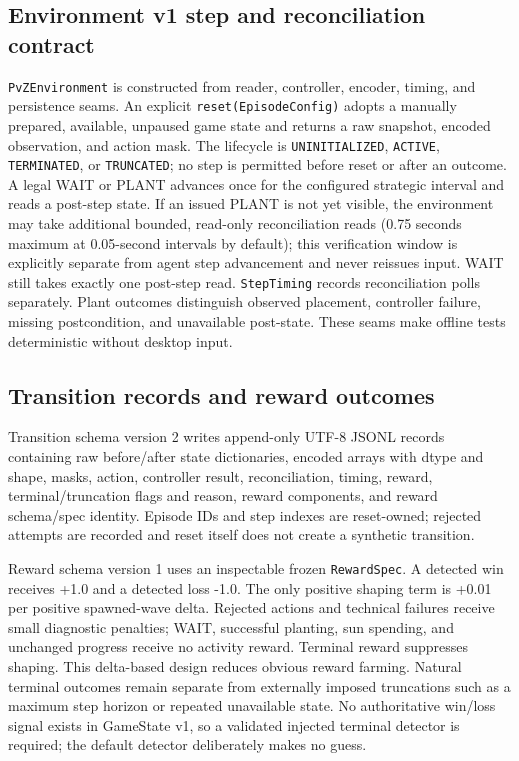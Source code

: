 \documentclass[11pt,a4paper]{article}
\begin{document}
\subsection{Environment v1 step and reconciliation contract}
\texttt{PvZEnvironment} is constructed from reader, controller, encoder, timing, and persistence seams. An explicit \texttt{reset(EpisodeConfig)} adopts a manually prepared, available, unpaused game state and returns a raw snapshot, encoded observation, and action mask. The lifecycle is \texttt{UNINITIALIZED}, \texttt{ACTIVE}, \texttt{TERMINATED}, or \texttt{TRUNCATED}; no step is permitted before reset or after an outcome. A legal WAIT or PLANT advances once for the configured strategic interval and reads a post-step state. If an issued PLANT is not yet visible, the environment may take additional bounded, read-only reconciliation reads (0.75 seconds maximum at 0.05-second intervals by default); this verification window is explicitly separate from agent step advancement and never reissues input. WAIT still takes exactly one post-step read. \texttt{StepTiming} records reconciliation polls separately. Plant outcomes distinguish observed placement, controller failure, missing postcondition, and unavailable post-state. These seams make offline tests deterministic without desktop input.

\subsection{Transition records and reward outcomes}
Transition schema version 2 writes append-only UTF-8 JSONL records containing raw before/after state dictionaries, encoded arrays with dtype and shape, masks, action, controller result, reconciliation, timing, reward, terminal/truncation flags and reason, reward components, and reward schema/spec identity. Episode IDs and step indexes are reset-owned; rejected attempts are recorded and reset itself does not create a synthetic transition.

Reward schema version 1 uses an inspectable frozen \texttt{RewardSpec}. A detected win receives +1.0 and a detected loss -1.0. The only positive shaping term is +0.01 per positive spawned-wave delta. Rejected actions and technical failures receive small diagnostic penalties; WAIT, successful planting, sun spending, and unchanged progress receive no activity reward. Terminal reward suppresses shaping. This delta-based design reduces obvious reward farming. Natural terminal outcomes remain separate from externally imposed truncations such as a maximum step horizon or repeated unavailable state. No authoritative win/loss signal exists in GameState v1, so a validated injected terminal detector is required; the default detector deliberately makes no guess.
\end{document}
